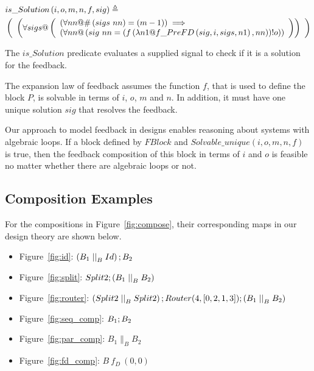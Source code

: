 \begin{definition}[$is\_Solution$] \label{def:is_solution}
    \begin{align*}
       & is\_Solution\left(i, o, m, n, f,sig\right) \defs \\
       &\left(
       \begin{array}[]{l}
            \left(\forall sigs @ \left(
                \begin{array}[]{l}
                    \left(\forall nn @ \#\left(sigs~nn\right) = (m - 1)\right) \implies \\
                    \left(\forall nn @ \left(sig~nn = \left(f \left(\lambda n1@ f\_PreFD\left(sig, i, sigs, n1\right), nn\right)\right)!o\right)\right)
                \end{array} \right)\right)
       \end{array}
       \right)
    \end{align*}
\end{definition}
The $is\_Solution$ predicate evaluates a supplied signal to check if it is a solution for the feedback.

The expansion law of feedback assumes the function $f$, that is used to define the block $P$, is solvable in terms of $i$, $o$, $m$ and $n$. In addition, it must have one unique solution $sig$ that resolves the feedback. 

Our approach to model feedback in designs enables reasoning about systems with algebraic loops. If a block defined by $FBlock$ and $Solvable\_unique\left(i, o, m, n, f\right)$ is true, then the feedback composition of this block in terms of $i$ and $o$ is feasible no matter whether there are algebraic loops or not.

\subsection{Composition Examples}
For the compositions in Figure~\ref{fig:compose}, their corresponding maps in our design theory are shown below.
\begin{itemize}
    \item Figure~\ref{fig:id}: $\left(B_1 \parallel_B Id\right) \dcomp B_2$ 
    \item Figure~\ref{fig:split}: $Split2 \dcomp \left(B_1 \parallel_B B_2\right)$ 
    \item Figure~\ref{fig:router}: $\left(Split2 \parallel_B Split2\right) \dcomp Router(4, [0,2,1,3]) \dcomp \left(B_1 \parallel_B B_2\right)$ 
    \item Figure~\ref{fig:seq_comp}: $B_1 ; B_2$ 
    \item Figure~\ref{fig:par_comp}: $B_1 \parallel_B B_2$ 
    \item Figure~\ref{fig:fd_comp}: $B~f_D~(0, 0)$ 
\end{itemize}
